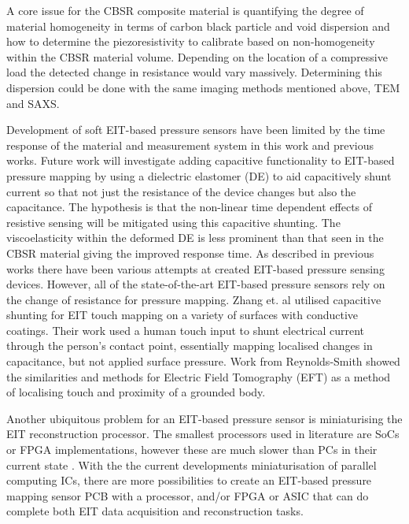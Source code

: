 A core issue for the CBSR composite material is quantifying the degree of material homogeneity in terms of carbon black particle and void dispersion and how to determine the piezoresistivity to calibrate based on non-homogeneity within the CBSR material volume. Depending on the location of a compressive load the detected change in resistance would vary massively. Determining this dispersion could be done with the same imaging methods mentioned above, TEM and SAXS.

Development of soft EIT-based pressure sensors have been limited by the time response of the material and measurement system in this work and previous works. Future work will investigate adding capacitive functionality to EIT-based pressure mapping by using a dielectric elastomer (DE) to aid capacitively shunt current so that not just the resistance of the device changes but also the capacitance. The hypothesis is that the non-linear time dependent effects of resistive sensing will be mitigated using this capacitive shunting. The viscoelasticity within the deformed DE is less prominent than that seen in the CBSR material giving the improved response time. As described in previous works \cite{Ellingham2024} there have been various attempts at created EIT-based pressure sensing devices. However, all of the state-of-the-art EIT-based pressure sensors rely on the change of resistance for pressure mapping. Zhang et. al \cite{Zhang2017} utilised capacitive shunting for EIT touch mapping on a variety of surfaces with conductive coatings. Their work used a human touch input to shunt electrical current through the person's contact point, essentially mapping localised changes in capacitance, but not applied surface pressure. Work from Reynolds-Smith \cite{Reynoldssmith1995,Reynoldssmith1999} showed the similarities and methods for Electric Field Tomography (EFT) as a method of localising touch and proximity of a grounded body. 

Another ubiquitous problem for an EIT-based pressure sensor is miniaturising the EIT reconstruction processor. The smallest processors used in literature are SoCs or FPGA implementations, however these are much slower than PCs in their current state \cite{ZamoraArellano2020,Kim2017,Takhti2019,Liu2019}. With the the current developments miniaturisation of parallel computing ICs, there are more possibilities to create an EIT-based pressure mapping sensor PCB with a processor, and/or FPGA or ASIC that can do complete both EIT data acquisition and reconstruction tasks.

